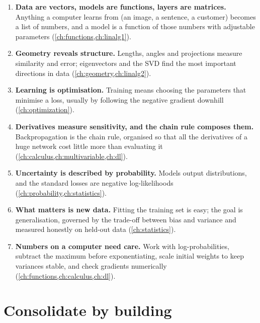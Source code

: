 \begin{keytakeaways}
\begin{enumerate}[label=\arabic*.]
  \item \textbf{Data are vectors, models are functions, layers are matrices.}
    Anything a computer learns from (an image, a sentence, a customer) becomes a
    list of numbers, and a model is a function of those numbers with adjustable
    parameters (\cref{ch:functions,ch:linalg1}).
  \item \textbf{Geometry reveals structure.} Lengths, angles and projections
    measure similarity and error; eigenvectors and the SVD find the most important
    directions in data (\cref{ch:geometry,ch:linalg2}).
  \item \textbf{Learning is optimisation.} Training means choosing the parameters
    that minimise a loss, usually by following the negative gradient downhill
    (\cref{ch:optimization}).
  \item \textbf{Derivatives measure sensitivity, and the chain rule composes them.}
    Backpropagation is the chain rule, organised so that all the derivatives of a
    huge network cost little more than evaluating it
    (\cref{ch:calculus,ch:multivariable,ch:dl}).
  \item \textbf{Uncertainty is described by probability.} Models output
    distributions, and the standard losses are negative log-likelihoods
    (\cref{ch:probability,ch:statistics}).
  \item \textbf{What matters is new data.} Fitting the training set is easy; the
    goal is generalisation, governed by the trade-off between bias and variance and
    measured honestly on held-out data (\cref{ch:statistics}).
  \item \textbf{Numbers on a computer need care.} Work with log-probabilities,
    subtract the maximum before exponentiating, scale initial weights to keep
    variances stable, and check gradients numerically
    (\cref{ch:functions,ch:calculus,ch:dl}).
\end{enumerate}
\end{keytakeaways}

\section{Consolidate by building}\label{sec:projects}

